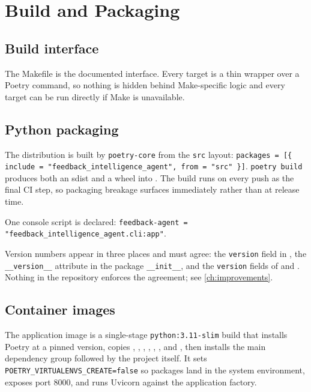 
\chapter{Build and Packaging}
\label{ch:build}

\section{Build interface}

The Makefile is the documented interface. Every target is a thin wrapper over a
Poetry command, so nothing is hidden behind Make-specific logic and every
target can be run directly if Make is unavailable.



\section{Python packaging}

The distribution is built by \texttt{poetry-core} from the \texttt{src} layout:
\texttt{packages = [\{ include = "feedback\_intelligence\_agent", from = "src" \}]}.
\texttt{poetry build} produces both an sdist and a wheel into .
The build runs on every push as the final CI step, so packaging breakage
surfaces immediately rather than at release time.

One console script is declared:
\texttt{feedback-agent = "feedback\_intelligence\_agent.cli:app"}.

Version numbers appear in three places and must agree: the
\texttt{version} field in , the
\texttt{\_\_version\_\_} attribute in the package \texttt{\_\_init\_\_}, and
the \texttt{version} fields of  and
. Nothing in the repository enforces the agreement; see
\cref{ch:improvements}.

\section{Container images}



The application image is a single-stage \texttt{python:3.11-slim} build that
installs Poetry at a pinned version, copies ,
, , , ,
, and , then installs the main dependency group
followed by the project itself. It sets
\texttt{POETRY\_VIRTUALENVS\_CREATE=false} so packages land in the system
environment, exposes port 8000, and runs Uvicorn against the application
factory.

